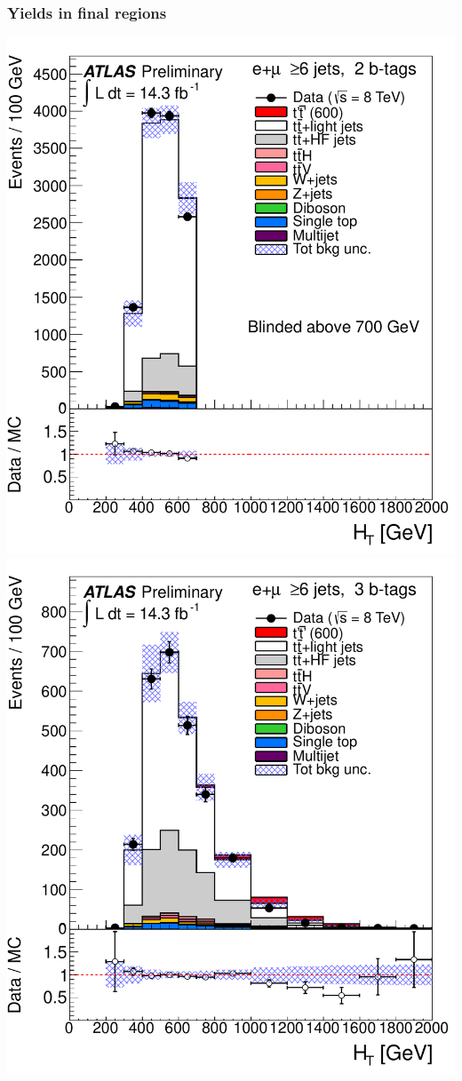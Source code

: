 \begin{frame}\frametitle{Yields in final regions}
\centering\scriptsize

\myskip
\begin{minipage}{.5\textwidth}\centering

\includegraphics[width=.5\textwidth]{pics/htx_final/HTAll_6jetin2btagex_ELEMUON.pdf}
\includegraphics[width=.5\textwidth]{pics/htx_final/HTAll_6jetin3btagex_ELEMUON.pdf}


\end{minipage}
\end{frame}
